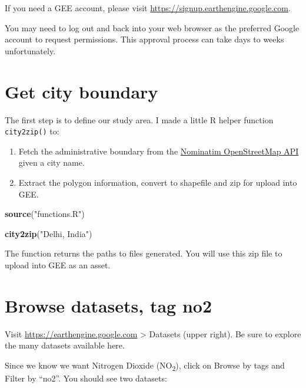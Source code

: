 \documentclass[]{book}
\newenvironment{Shaded}{\begin{snugshade}}{\end{snugshade}}
\newcommand{\KeywordTok}[1]{\textcolor[rgb]{0.13,0.29,0.53}{\textbf{#1}}}
\newcommand{\NormalTok}[1]{#1}
\newcommand{\StringTok}[1]{\textcolor[rgb]{0.31,0.60,0.02}{#1}}
\providecommand{\tightlist}{%
  \setlength{\itemsep}{0pt}\setlength{\parskip}{0pt}}
\begin{document}
If you need a GEE account, please visit \url{https://signup.earthengine.google.com}.

You may need to log out and back into your web browser as the preferred Google account to request permissions. This approval process can take days to weeks unfortunately.

\hypertarget{get-city-boundary}{%
\section{Get city boundary}\label{get-city-boundary}}

The first step is to define our study area. I made a little R helper function \texttt{city2zip()} to:

\begin{enumerate}
\def\labelenumi{\arabic{enumi}.}
\tightlist
\item
  Fetch the administrative boundary from the \href{https://nominatim.org/release-docs/develop/api/Search/}{Nominatim OpenStreetMap API} given a city name.
\item
  Extract the polygon information, convert to shapefile and zip for upload into GEE.
\end{enumerate}

\begin{Shaded}
\begin{Highlighting}[]
\KeywordTok{source}\NormalTok{(}\StringTok{"functions.R"}\NormalTok{)}

\KeywordTok{city2zip}\NormalTok{(}\StringTok{"Delhi, India"}\NormalTok{)}
\end{Highlighting}
\end{Shaded}

The function returns the paths to files generated. You will use this zip file to upload into GEE as an asset.

\hypertarget{browse-datasets-tag-no2}{%
\section{Browse datasets, tag no2}\label{browse-datasets-tag-no2}}

Visit \url{https://earthengine.google.com} \textgreater{} Datasets (upper right). Be sure to explore the many datasets available here.

Since we know we want Nitrogen Dioxide (NO\textsubscript{2}), click on Browse by tags and Filter by ``no2''. You should see two datasets:
\end{document}
